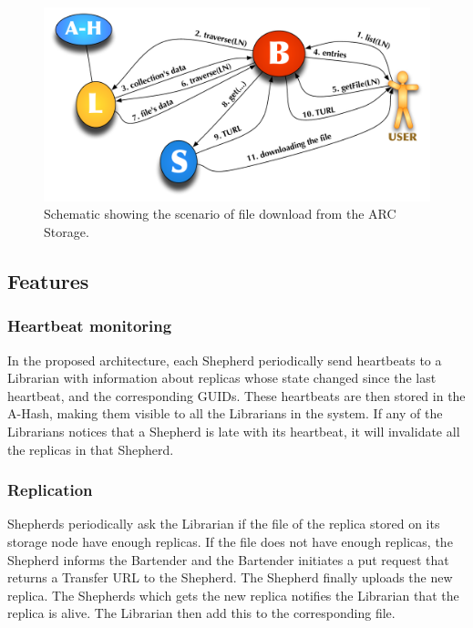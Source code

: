 \documentclass[final]{ieee}
\begin{document}
\begin{figure}
\centering
\includegraphics[width=1.0\columnwidth]{arc1-storage-downloading.pdf}
\caption{Schematic showing the scenario of file download from the ARC Storage.}
\label{arc1-storage-downloading}
\end{figure}  


\subsection{Features}
\subsubsection{Heartbeat monitoring}
\label{Heartbeat and Replication}
In the proposed architecture, each Shepherd periodically send
heartbeats to a Librarian with information about replicas
whose state changed since the last heartbeat, and the corresponding
GUIDs. These heartbeats are then stored in the A-Hash, making them
visible to all the Librarians in the system. If any of the Librarians
notices that a Shepherd is late with its heartbeat, it will invalidate
all the replicas in that Shepherd.  

\subsubsection{Replication}
\label{Replication}
Shepherds periodically ask the Librarian if the file of the replica stored on
its storage node have enough replicas. If the file does not have
enough replicas, the Shepherd informs the Bartender and the Bartender initiates
a put request that returns a Transfer URL to the Shepherd. The
Shepherd finally uploads the new replica. The Shepherds which gets the new replica notifies the
Librarian that the replica is alive. The Librarian then add this to
the corresponding file.
\end{document}
